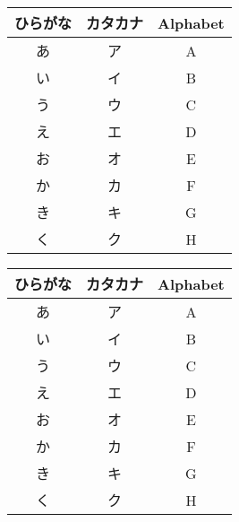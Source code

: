 \documentclass{tarticle}
\begin{document}
\begin{longtable}[c]{ccc}
\hline
ひらがな & カタカナ & Alphabet \\
\hline
あ & ア & A \\
い & イ & B \\
う & ウ & C \\
え & エ & D \\
お & オ & E \\
か & カ & F \\
き & キ & G \\
く & ク & H \\
\end{longtable}

\clearpage

\null
\clearpage

\renewcommand{\arraystretch}{1.5}
\begin{longtable}[c]{ccc}
\hline
ひらがな & カタカナ & Alphabet \\
\hline
あ & ア & A \\
い & イ & B \\
う & ウ & C \\
え & エ & D \\
お & オ & E \\
か & カ & F \\
き & キ & G \\
く & ク & H \\
\end{longtable}
\end{document}
